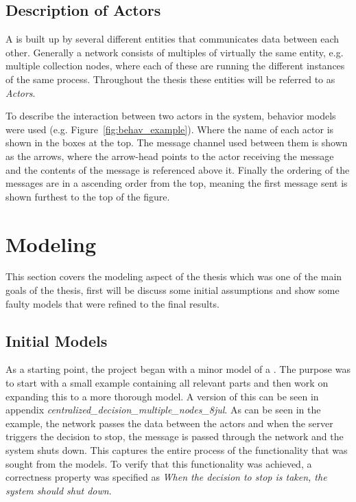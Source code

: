 

\subsection{Description of Actors}

A \wsn is built up by several different entities that communicates data between each other. Generally a network consists of multiples of virtually the same entity, e.g. multiple collection nodes, where each of these are running the different instances of the same process. Throughout the thesis these entities will be referred to as \textit{Actors}.

To describe the interaction between two actors in the system, behavior models were used (e.g. Figure~\ref{fig:behav_example}). Where the name of each actor is shown in the boxes at the top. The message channel used between them is shown as the arrows, where the arrow-head points to the actor receiving the message and the contents of the message is referenced above it. Finally the ordering of the messages are in a ascending order from the top, meaning the first message sent is shown furthest to the top of the figure.

\section{Modeling}

This section covers the modeling aspect of the thesis which was one of the main goals of the thesis, first will be discuss some initial assumptions and show some faulty models that were refined to the final results. 

\subsection{Initial Models}

As a starting point, the project began with a minor model of a \wsn. The purpose was to start with a small example containing all relevant parts and then work on expanding this to a more thorough model. A version of this can be seen in appendix \textit{centralized\_decision\_multiple\_nodes\_8jul}. As can be seen in the example, the network passes the data between the actors and when the server triggers the decision to stop, the message is passed through the network and the system shuts down. This captures the entire process of the functionality that was sought from the models. To verify that this functionality was achieved, a correctness property was specified as \textit{When the decision to stop is taken, the system should shut down}. \\ 

